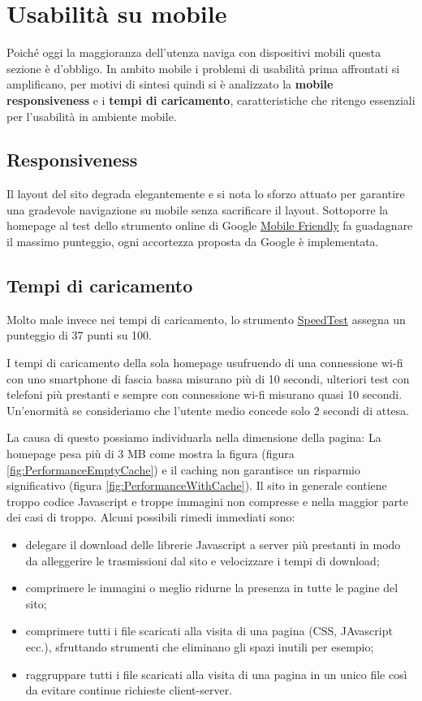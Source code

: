 
\section{Usabilità su mobile}
	Poiché oggi la maggioranza dell'utenza naviga con dispositivi mobili questa sezione è d'obbligo. 
	In ambito mobile i problemi di usabilità prima affrontati si amplificano, per motivi di sintesi quindi si è analizzato la \textbf{mobile responsiveness} e i \textbf{tempi di caricamento}, caratteristiche che ritengo essenziali per l'usabilità in ambiente mobile.

	\subsection{Responsiveness}
		Il layout del sito degrada elegantemente e si nota lo sforzo attuato per garantire una gradevole navigazione su mobile senza sacrificare il layout. Sottoporre la homepage al test dello strumento online di Google \href{https://www.google.com/webmasters/tools/mobile-friendly/?hl=it}{Mobile Friendly} fa guadagnare il massimo punteggio, ogni accortezza proposta da Google è implementata.
		
	\subsection{Tempi di caricamento}
		Molto male invece nei tempi di caricamento, lo strumento \href{https://developers.google.com/speed/pagespeed/insights/}{SpeedTest} assegna un punteggio di 37 punti su 100. 
		
		I tempi di caricamento della sola homepage usufruendo di una connessione wi-fi con uno smartphone di fascia bassa misurano più di 10 secondi, ulteriori test con telefoni più prestanti e sempre con connessione wi-fi misurano quasi 10 secondi. Un'enormità se consideriamo che l'utente medio concede solo 2 secondi di attesa.
		
		La causa di questo possiamo individuarla nella dimensione della pagina:
		La homepage pesa più di 3 MB come mostra la figura (figura \ref{fig:PerformanceEmptyCache}) e il caching non garantisce un risparmio significativo (figura \ref{fig:PerformanceWithCache}). Il sito in generale contiene troppo codice Javascript e troppe immagini non compresse e nella maggior parte dei casi di troppo. Alcuni possibili rimedi immediati sono:
		\begin{itemize}
			\item delegare il download delle librerie Javascript a server più prestanti in modo da alleggerire le trasmissioni dal sito e velocizzare i tempi di download;
			\item comprimere le immagini o meglio ridurne la presenza in tutte le pagine del sito;
			\item comprimere tutti i file scaricati alla visita di una pagina (CSS, JAvascript ecc.), sfruttando strumenti che eliminano gli spazi inutili per esempio;
			\item raggruppare tutti i file scaricati alla visita di una pagina in un unico file così da evitare continue richieste client-server.
		\end{itemize}
		
